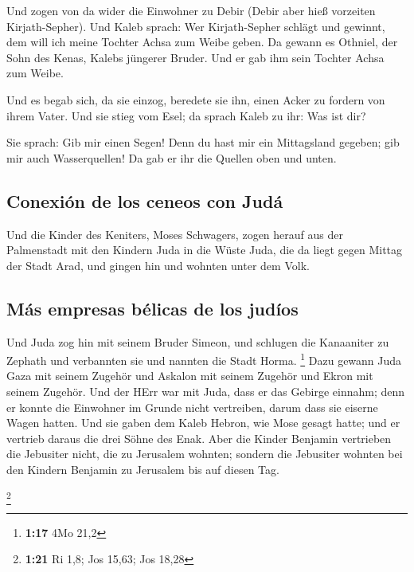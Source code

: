  Und zogen von da wider die Einwohner zu Debir (Debir
aber hieß vorzeiten Kirjath-Sepher).  Und Kaleb sprach:
Wer Kirjath-Sepher schlägt und gewinnt, dem will ich meine Tochter Achsa
zum Weibe geben.  Da gewann es Othniel, der Sohn des
Kenas, Kalebs jüngerer Bruder. Und er gab ihm sein Tochter Achsa zum
Weibe.

 Und es begab sich, da sie einzog, beredete sie ihn,
einen Acker zu fordern von ihrem Vater. Und sie stieg vom Esel; da
sprach Kaleb zu ihr: Was ist dir?

 Sie sprach: Gib mir einen Segen! Denn du hast mir ein
Mittagsland gegeben; gib mir auch Wasserquellen! Da gab er ihr die
Quellen oben und unten.

\hypertarget{conexiuxf3n-de-los-ceneos-con-juduxe1}{%
\subsection{Conexión de los ceneos con
Judá}\label{conexiuxf3n-de-los-ceneos-con-juduxe1}}

 Und die Kinder des Keniters, Moses Schwagers, zogen
herauf aus der Palmenstadt mit den Kindern Juda in die Wüste Juda, die
da liegt gegen Mittag der Stadt Arad, und gingen hin und wohnten unter
dem Volk.

\hypertarget{muxe1s-empresas-buxe9licas-de-los-juduxedos}{%
\subsection{Más empresas bélicas de los
judíos}\label{muxe1s-empresas-buxe9licas-de-los-juduxedos}}

 Und Juda zog hin mit seinem Bruder Simeon, und schlugen
die Kanaaniter zu Zephath und verbannten sie und nannten die Stadt
Horma. \footnote{\textbf{1:17} 4Mo 21,2}  Dazu gewann
Juda Gaza mit seinem Zugehör und Askalon mit seinem Zugehör und Ekron
mit seinem Zugehör.  Und der HErr war mit Juda, dass er
das Gebirge einnahm; denn er konnte die Einwohner im Grunde nicht
vertreiben, darum dass sie eiserne Wagen hatten.  Und sie
gaben dem Kaleb Hebron, wie Mose gesagt hatte; und er vertrieb daraus
die drei Söhne des Enak.  Aber die Kinder Benjamin
vertrieben die Jebusiter nicht, die zu Jerusalem wohnten; sondern die
Jebusiter wohnten bei den Kindern Benjamin zu Jerusalem bis auf diesen
Tag.

\footnote{\textbf{1:21} Ri 1,8; Jos 15,63; Jos 18,28}

